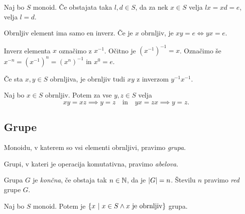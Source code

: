 \begin{trditev}
Naj bo $S$ monoid. Če obstajata taka $l,d\in S$, da za nek $x\in S$ velja $lx=xd=e$, velja $l=d$.
\end{trditev}

\obvs

\begin{posledica}
Obrnljiv element ima samo en inverz. Če je $x$ obrnljiv, je $xy=e\iff yx=e$.
\end{posledica}

\begin{opomba}
Inverz elementa $x$ označimo z $x^{-1}$. Očitno je $(x^{-1})^{-1}=x$. Označimo še $x^{-n}=(x^{-1})^n=(x^n)^{-1}$ in $x^0=e$.
\end{opomba}

\begin{trditev}
Če sta $x,y\in S$ obrnljiva, je obrnljiv tudi $xy$ z inverzom $y^{-1}x^{-1}$.
\end{trditev}

\obvs

\begin{trditev}
Naj bo $x\in S$ obrnljiv. Potem za vse $y,z\in S$ velja
\[
xy=xz\implies y=z\quad\text{in}\quad yx=zx\implies y=z.
\]
\end{trditev}

\obvs

\newpage

\subsection{Grupe}

\begin{definicija}
Monoidu, v katerem so vsi elementi obrnljivi, pravimo \emph{grupa}.
\end{definicija}

\begin{definicija}
Grupi, v kateri je operacija komutativna, pravimo \emph{abelova}.
\end{definicija}

\begin{definicija}
Grupa $G$ je \emph{končna}, če obstaja tak $n\in\mathbb{N}$, da je $\left\lvert G\right\rvert=n$. Številu $n$ pravimo \emph{red} grupe $G$.
\end{definicija}

\begin{trditev}
Naj bo $S$ monoid. Potem je $\left\{x~\middle\vert~x\in S\land\text{$x$ je obrnljiv}\right\}$ grupa.
\end{trditev}

